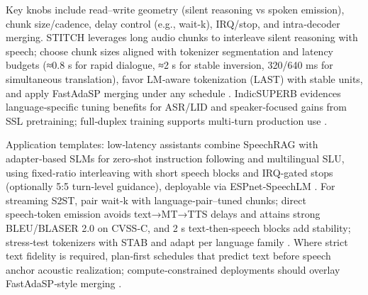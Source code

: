 Key knobs include read–write geometry (silent reasoning vs spoken emission), chunk size/cadence, delay control (e.g., wait‑k), IRQ/stop, and intra‑decoder merging. STITCH leverages long audio chunks to interleave silent reasoning with speech; choose chunk sizes aligned with tokenizer segmentation and latency budgets (≈0.8 s for rapid dialogue, ≈2 s for stable inversion, 320/640 ms for simultaneous translation), favor LM‑aware tokenization (LAST) with stable units, and apply FastAdaSP merging under any schedule \cite{chiang2025stitchsimultaneousthinkingtalkingchunked,turetzky2024lastlanguagemodelawarespeechtokenization,lu2024fastadaspmultitaskadaptedefficientinfere,vashishth2024stabspeechtokenizerassessmentbenchmark,kando2025exploringeffectsegmentationvocabularysiz,guo2025streamuniachievingstreamingspeechtransla}. IndicSUPERB evidences language‑specific tuning benefits for ASR/LID and speaker‑focused gains from SSL pretraining; full‑duplex training supports multi‑turn production use \cite{entry2025indicsuperbspeechprocessinguniversalperf,yang2024buildingtaiwanesemandarinspokenlanguagem}.

Application templates: low‑latency assistants combine SpeechRAG with adapter‑based SLMs for zero‑shot instruction following and multilingual SLU, using fixed‑ratio interleaving with short speech blocks and IRQ‑gated stops (optionally 5:5 turn‑level guidance), deployable via ESPnet‑SpeechLM \cite{min2025speechretrievalaugmentedgenerationwithou,wang2023slmbridgethingapbetweenspeechtextfoundat,tian2025espnetspeechlmopenspeechlanguagemodeltoo,entry2025indicsuperbspeechprocessinguniversalperf}. For streaming S2ST, pair wait‑k with language‑pair–tuned chunks; direct speech‑token emission avoids text→MT→TTS delays and attains strong BLEU/BLASER 2.0 on CVSS‑C, and 2 s text‑then‑speech blocks add stability; stress‑test tokenizers with STAB and adapt per language family \cite{zhao2024textlessstreamingspeechtranslationsemant,entry2025indicsuperbspeechprocessinguniversalperf,vashishth2024stabspeechtokenizerassessmentbenchmark}. Where strict text fidelity is required, plan‑first schedules that predict text before speech anchor acoustic realization; compute‑constrained deployments should overlay FastAdaSP‑style merging \cite{turetzky2024lastlanguagemodelawarespeechtokenization,wu2023speechgenunlockinggenerativepowerspeechl,lu2024fastadaspmultitaskadaptedefficientinfere}.


